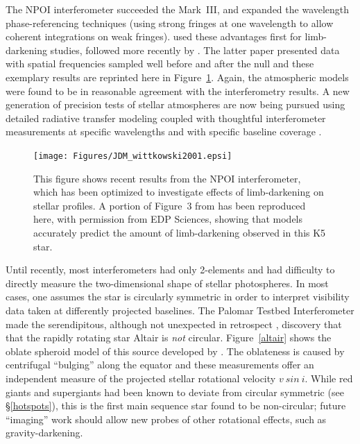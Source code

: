 \documentclass[12pt]{iopart}
\begin{document}
The NPOI interferometer succeeded the Mark~III, and expanded the
wavelength phase-referencing techniques (using strong fringes at one
wavelength to allow coherent integrations on weak fringes).
\citet{hajian1998} used these advantages first for limb-darkening
studies, followed more recently by \citet{wittkowski2001}. The latter
paper presented data with spatial frequencies sampled well before and
after the null and these exemplary results are reprinted here in
Figure~\ref{limbdarkening}.  Again, the atmospheric models were found
to be in reasonable agreement with the interferometry results. A new
generation of precision tests of stellar atmospheres are now being pursued
using detailed radiative transfer modeling coupled with thoughtful
interferometer measurements at specific wavelengths and with specific
baseline coverage \citep[e.g.,][]{aufdenberg2002}.

\begin{figure}[tbhp]
\begin{center}
\texttt{[image: Figures/JDM\_wittkowski2001.epsi]}
\caption{\footnotesize This figure shows recent results from the
  NPOI interferometer, which has been optimized to investigate effects
  of limb-darkening on stellar profiles.  A portion of Figure~3 from
  \citet{wittkowski2001} has been reproduced here, with permission
  from EDP Sciences, showing that models accurately predict the
  amount of limb-darkening observed in this K5 star.
\label{limbdarkening}}
\end{center}
\end{figure}

Until recently, most interferometers had only 2-elements and had
difficulty to directly measure the two-dimensional shape of stellar
photospheres. In most cases, one assumes the star is circularly
symmetric in order to interpret visibility data taken at differently
projected baselines.  The Palomar Testbed Interferometer made the
serendipitous, although not unexpected in retrospect
\citep{hanburybrown1967}, discovery that that the rapidly rotating
star Altair is {\em not} circular.  Figure~\ref{altair} shows the
oblate spheroid model of this source developed by
\citet{vanbelle2001}. The oblateness is caused by centrifugal
``bulging'' along the equator and these measurements offer an
independent measure of the projected stellar rotational velocity
$v~sin~i$.  While red giants and supergiants had been known to deviate
from circular symmetric (see \S\ref{hotspots}), this is the first main
sequence star found to be non-circular; future ``imaging'' work should
allow new probes of other rotational effects, such as
gravity-darkening.
\end{document}
